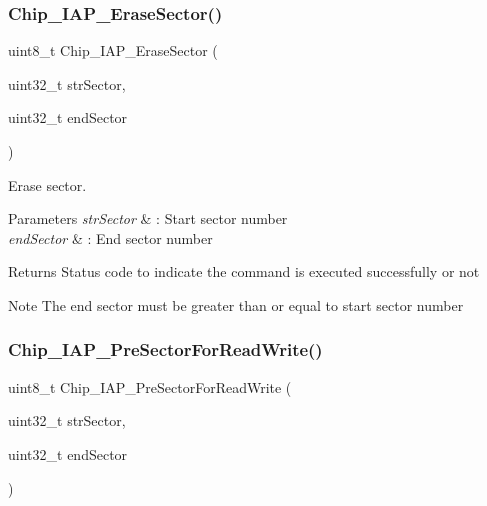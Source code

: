\subsubsection{\texorpdfstring{Chip\+\_\+\+I\+A\+P\+\_\+\+Erase\+Sector()}{Chip\_IAP\_EraseSector()}}
{\footnotesize\ttfamily uint8\+\_\+t Chip\+\_\+\+I\+A\+P\+\_\+\+Erase\+Sector (\begin{DoxyParamCaption}\item[{uint32\+\_\+t}]{str\+Sector,  }\item[{uint32\+\_\+t}]{end\+Sector }\end{DoxyParamCaption})}



Erase sector. 


\begin{DoxyParams}{Parameters}
{\em str\+Sector} & \+: Start sector number \\
\hline
{\em end\+Sector} & \+: End sector number \\
\hline
\end{DoxyParams}
\begin{DoxyReturn}{Returns}
Status code to indicate the command is executed successfully or not 
\end{DoxyReturn}
\begin{DoxyNote}{Note}
The end sector must be greater than or equal to start sector number 
\end{DoxyNote}
\mbox{\label{group___c_o_m_m_o_n___i_a_p_gac45b60745e55670c7fa806e2865625c4}} 
\subsubsection{\texorpdfstring{Chip\+\_\+\+I\+A\+P\+\_\+\+Pre\+Sector\+For\+Read\+Write()}{Chip\_IAP\_PreSectorForReadWrite()}}
{\footnotesize\ttfamily uint8\+\_\+t Chip\+\_\+\+I\+A\+P\+\_\+\+Pre\+Sector\+For\+Read\+Write (\begin{DoxyParamCaption}\item[{uint32\+\_\+t}]{str\+Sector,  }\item[{uint32\+\_\+t}]{end\+Sector }\end{DoxyParamCaption})}



